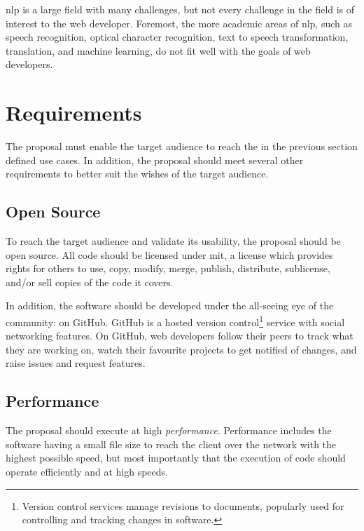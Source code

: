 \noindent \gls{nlp} is a large field with many challenges, but not every
  challenge in the field is of interest to the web developer.
Foremost, the more academic areas of \gls{nlp}, such as speech recognition,
  optical character recognition, text to speech transformation, translation,
  and machine learning, do not fit well with the goals of web developers.

\section{Requirements}\label{requirements}

The proposal must enable the target audience to reach the in the previous
  section defined use cases.
In addition, the proposal should meet several other requirements to better
  suit the wishes of the target audience.

\subsection{Open Source}\label{open-source}

To reach the target audience and validate its usability, the proposal
  should be open source.
All code should be licensed under \acrshort{mit}, a license which
  provides rights for others to use, copy, modify, merge, publish,
  distribute, sublicense, and\slash or sell copies of the code it covers.

In addition, the software should be developed under the all-seeing eye of
  the community: on GitHub.
GitHub is a hosted version control\footnote{Version
    control services manage revisions to documents, popularly used for
    controlling and tracking changes in software.} service with social
  networking features.
On GitHub, web developers follow their peers to track what they are
  working on, watch their favourite projects to get notified of changes,
  and raise issues and request features.

\subsection{Performance}\label{performance}

The proposal should execute at high \emph{performance}.
Performance includes the software having a small file size to reach the
  client over the network with the highest possible speed, but most
  importantly that the execution of code should operate efficiently and
  at high speeds.

